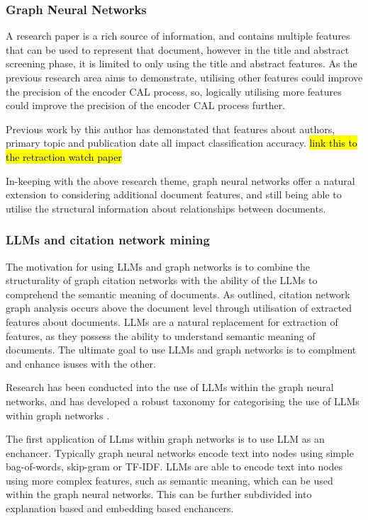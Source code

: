 \documentclass[../main.tex]{subfiles}
\begin{document}
    
\subsubsection{Graph Neural Networks}

    A research paper is a rich source of information, and contains multiple features that can be used to represent that document, however in the title and abstract screening phase, it is limited to only using the title and abstract features. As the previous research area aims to demonstrate, utilising other features could improve the precision of the encoder CAL process, so, logically utilising more features could improve the precision of the encoder CAL process further. 

    Previous work by this author has demonstated that features about authors, primary topic and publication date all impact classification accuracy. \hl{link this to the retraction watch paper}

    In-keeping with the above research theme, graph neural networks offer a natural extension to considering additional document features, and still being able to utilise the structural information about relationships between documents. 

    
    \subsubsection{LLMs and citation network mining}

    The motivation for using LLMs and graph networks is to combine the structurality of graph citation networks with the ability of the LLMs to comprehend the semantic meaning of documents. As outlined, citation network graph analysis occurs above the document level through utilisation of extracted features about documents. LLMs are a natural replacement for extraction of features, as they possess the ability to understand semantic meaning of documents. The ultimate goal to use LLMs and graph networks is to complment and enhance isuses with the other. 

    Research has been conducted into the use of LLMs within the graph neural networks, and has developed a robust taxonomy for categorising the use of LLMs within graph networks \cite{llm4g}. 
    
    The first application of LLms within graph networks is to use LLM as an enchancer. Typically graph neural networks encode text into nodes using simple bag-of-words, skip-gram or TF-IDF. LLMs are able to encode text into nodes using more complex features, such as semantic meaning, which can be used within the graph neural networks. This can be further subdivided into explanation based and embedding based enchancers. 
    
\end{document}

